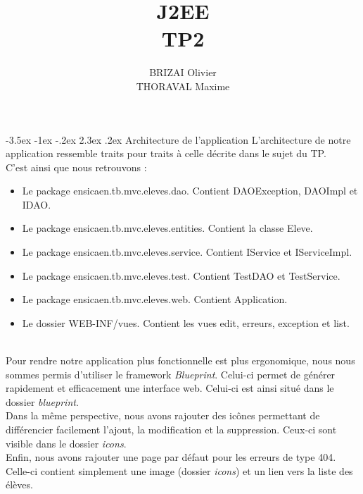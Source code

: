 \documentclass[a4paper,12pt]{article}
\makeatletter
\renewcommand\section{\@startsection {section}{1}{\z@}%
                           {-3.5ex \@plus -1ex \@minus -.2ex}%
                           {2.3ex \@plus.2ex}%
                           {\normalfont\Large\bfseries}}
\makeatother
\begin{document}
\newpage
\title{J2EE\\TP2}
\date{}
\author{BRIZAI Olivier\\THORAVAL Maxime}
\maketitle

\newpage
\section{Architecture de l'application}
L'architecture de notre application ressemble traits pour traits à celle décrite dans le sujet du TP.\\
C'est ainsi que nous retrouvons :
\begin{itemize}
	\item Le package ensicaen.tb.mvc.eleves.dao. Contient DAOException, DAOImpl et IDAO.
	\item Le package ensicaen.tb.mvc.eleves.entities. Contient la classe Eleve.
	\item Le package ensicaen.tb.mvc.eleves.service. Contient IService et IServiceImpl.
	\item Le package ensicaen.tb.mvc.eleves.test. Contient TestDAO et TestService.
	\item Le package ensicaen.tb.mvc.eleves.web. Contient Application.
	\item Le dossier WEB-INF/vues. Contient les vues edit, erreurs, exception et list.
\end{itemize}
~\\

Pour rendre notre application plus fonctionnelle est plus ergonomique, nous nous sommes permis d'utiliser le framework \textit{Blueprint}.
Celui-ci permet de générer rapidement et efficacement une interface web. Celui-ci est ainsi situé dans le dossier \textit{blueprint}.\\
Dans la même perspective, nous avons rajouter des icônes permettant de différencier facilement l'ajout, la modification et la suppression. 
Ceux-ci sont visible dans le dossier \textit{icons}.\\
Enfin, nous avons rajouter une page par défaut pour les erreurs de type 404. Celle-ci contient simplement une image (dossier \textit{icons}) et
un lien vers la liste des élèves.
\end{document}

